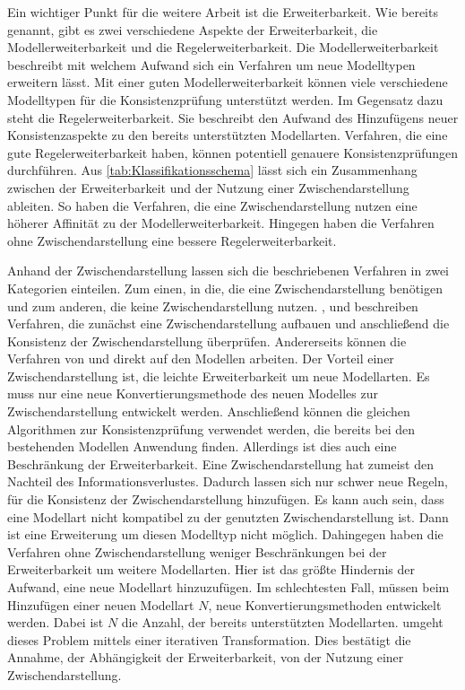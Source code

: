 Ein wichtiger Punkt für die weitere Arbeit ist die Erweiterbarkeit.
Wie bereits genannt, gibt es zwei verschiedene Aspekte der Erweiterbarkeit, die Modellerweiterbarkeit und die Regelerweiterbarkeit.
Die Modellerweiterbarkeit beschreibt mit welchem Aufwand sich ein Verfahren um neue Modelltypen erweitern lässt.
Mit einer guten Modellerweiterbarkeit können viele verschiedene Modelltypen für die Konsistenzprüfung unterstützt werden.
Im Gegensatz dazu steht die Regelerweiterbarkeit.
Sie beschreibt den Aufwand des Hinzufügens neuer Konsistenzaspekte zu den bereits unterstützten Modellarten.
Verfahren, die eine gute Regelerweiterbarkeit haben, können potentiell genauere Konsistenzprüfungen durchführen.
Aus \cref{tab:Klassifikationsschema} lässt sich ein Zusammenhang zwischen der Erweiterbarkeit und der Nutzung einer Zwischendarstellung ableiten.
So haben die Verfahren, die eine Zwischendarstellung nutzen eine höherer Affinität zu der Modellerweiterbarkeit.
Hingegen haben die Verfahren ohne Zwischendarstellung eine bessere Regelerweiterbarkeit.

Anhand der Zwischendarstellung lassen sich die beschriebenen Verfahren in zwei Kategorien einteilen.
Zum einen, in die, die eine Zwischendarstellung benötigen und zum anderen, die keine Zwischendarstellung nutzen.
\cite{Rasch2003}, \cite{Shinkawa2006} und \cite{Mens2005} beschreiben Verfahren, die zunächst eine Zwischendarstellung aufbauen und anschließend die Konsistenz der Zwischendarstellung überprüfen.
Andererseits können die Verfahren von \cite{Egyed2001} und \cite{Egyed2006} direkt auf den Modellen arbeiten.
Der Vorteil einer Zwischendarstellung ist, die leichte Erweiterbarkeit um neue Modellarten.
Es muss nur eine neue Konvertierungsmethode des neuen Modelles zur Zwischendarstellung entwickelt werden.
Anschließend können die gleichen Algorithmen zur Konsistenzprüfung verwendet werden, die bereits bei den bestehenden Modellen Anwendung finden.
Allerdings ist dies auch eine Beschränkung der Erweiterbarkeit.
Eine Zwischendarstellung hat zumeist den Nachteil des Informationsverlustes.
Dadurch lassen sich nur schwer neue Regeln, für die Konsistenz der Zwischendarstellung hinzufügen.
Es kann auch sein, dass eine Modellart nicht kompatibel zu der genutzten Zwischendarstellung ist.
Dann ist eine Erweiterung um diesen Modelltyp nicht möglich.
Dahingegen haben die Verfahren ohne Zwischendarstellung weniger Beschränkungen bei der Erweiterbarkeit um weitere Modellarten.
Hier ist das größte Hindernis der Aufwand, eine neue Modellart hinzuzufügen.
Im schlechtesten Fall, müssen beim Hinzufügen einer neuen Modellart $N$, neue Konvertierungsmethoden entwickelt werden.
Dabei ist $N$ die Anzahl, der bereits unterstützten Modellarten.
\cite{Egyed2001} umgeht dieses Problem mittels einer iterativen Transformation.
Dies bestätigt die Annahme, der Abhängigkeit der Erweiterbarkeit, von der Nutzung einer Zwischendarstellung.

